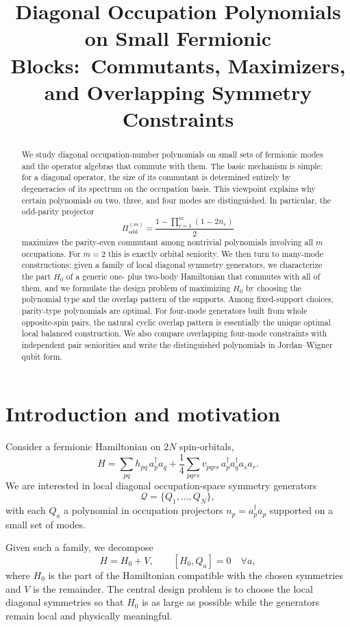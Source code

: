 \documentclass[11pt]{article}
\title{Diagonal Occupation Polynomials on Small Fermionic Blocks:\
Commutants, Maximizers, and Overlapping Symmetry Constraints}
\author{}
\date{}
\newcommand{\odd}{\mathrm{odd}}
\theoremstyle{definition}
\theoremstyle{remark}
\begin{document}
\maketitle

\begin{abstract}
We study diagonal occupation-number polynomials on small sets of fermionic modes and the operator algebras that commute with them. The basic mechanism is simple: for a diagonal operator, the size of its commutant is determined entirely by degeneracies of its spectrum on the occupation basis. This viewpoint explains why certain polynomials on two, three, and four modes are distinguished. In particular, the odd-parity projector
\[
\Pi^{(m)}_{\odd}=\frac{1-\prod_{r=1}^m(1-2n_r)}{2}
\]
maximizes the parity-even commutant among nontrivial polynomials involving all $m$ occupations. For $m=2$ this is exactly orbital seniority. We then turn to many-mode constructions: given a family of local diagonal symmetry generators, we characterize the part $H_0$ of a generic one- plus two-body Hamiltonian that commutes with all of them, and we formulate the design problem of maximizing $H_0$ by choosing the polynomial type and the overlap pattern of the supports. Among fixed-support choices, parity-type polynomials are optimal. For four-mode generators built from whole opposite-spin pairs, the natural cyclic overlap pattern is essentially the unique optimal local balanced construction. We also compare overlapping four-mode constraints with independent pair seniorities and write the distinguished polynomials in Jordan--Wigner qubit form.
\end{abstract}

\section{Introduction and motivation}
Consider a fermionic Hamiltonian on $2N$ spin-orbitals,
\begin{equation}
H
=
\sum_{pq} h_{pq}\,a_p^\dagger a_q
+
\frac14\sum_{pqrs} v_{pqrs}\,a_p^\dagger a_q^\dagger a_s a_r.
\end{equation}
We are interested in local diagonal occupation-space symmetry generators
\begin{equation}
\mathcal Q=\{Q_1,\dots,Q_N\},
\end{equation}
with each $Q_a$ a polynomial in occupation projectors $n_p=a_p^\dagger a_p$ supported on a small set of modes.

Given such a family, we decompose
\begin{equation}
H=H_0+V,
\qquad
[H_0,Q_a]=0
\quad \forall a,
\end{equation}
where $H_0$ is the part of the Hamiltonian compatible with the chosen symmetries and $V$ is the remainder. The central design problem is to choose the local diagonal symmetries so that $H_0$ is as large as possible while the generators remain local and physically meaningful.
\end{document}
